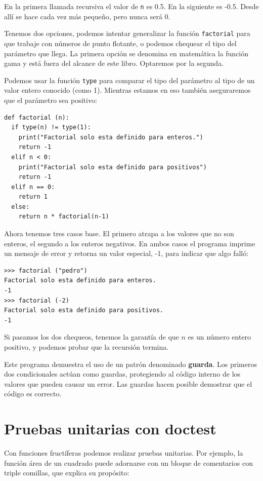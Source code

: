  

En la primera llamada recursiva el valor de \texttt{n} es 0.5. En
la siguiente es -0.5. Desde allí se hace cada vez más pequeño, pero
nunca será 0.

Tenemos dos opciones, podemos intentar generalizar la función \texttt{factorial}
para que trabaje con números de punto flotante, o podemos chequear
el tipo del parámetro que llega. La primera opción se denomina en
matemática la función gama y está fuera del alcance de este libro.
Optaremos por la segunda.


Podemos usar la función \texttt{type} para comparar el tipo del parámetro
al tipo de un valor entero conocido (como 1). Mientras estamos en
eso también aseguraremos que el parámetro sea positivo:

\begin{verbatim}
def factorial (n):
  if type(n) != type(1):
    print("Factorial solo esta definido para enteros.")
    return -1
  elif n < 0:
    print("Factorial solo esta definido para positivos")
    return -1
  elif n == 0:
    return 1
  else:
    return n * factorial(n-1)
\end{verbatim}

Ahora tenemos tres casos base. El primero atrapa a los valores que
no son enteros, el segundo a los enteros negativos. En ambos casos
el programa imprime un mensaje de error y retorna un valor especial,
-1, para indicar que algo falló:
\begin{verbatim}
>>> factorial ("pedro")
Factorial solo esta definido para enteros.
-1
>>> factorial (-2)
Factorial solo esta definido para positivos.
-1
\end{verbatim}

Si pasamos los dos chequeos, tenemos la garantía de que $n$ es un
número entero positivo, y podemos probar que la recursión termina.

Este programa demuestra el uso de un patrón denominado \textbf{guarda}.
Los primeros dos condicionales actúan como guardas, protegiendo al
código interno de los valores que pueden causar un error. Las guardas
hacen posible demostrar que el código es correcto.

\section{Pruebas unitarias con doctest}

Con funciones fructíferas podemos realizar pruebas unitarias. Por
ejemplo, la función área de un cuadrado puede adornarse con un bloque
de comentarios con triple comillas, que explica su propósito:

